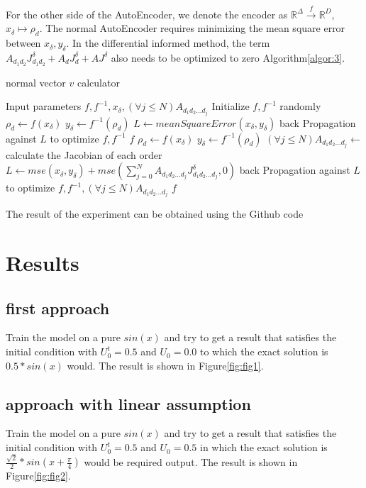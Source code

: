 \documentclass{article}
\begin{document}
For the other side of the AutoEncoder, we denote
the encoder as $\mathbb{R}^{\Delta} \xrightarrow{f} \mathbb{R}^{D}$,
$x_\delta \mapsto {\rho}_d$. The normal AutoEncoder
requires minimizing the mean square error between
$x_\delta, y_\delta$. In the differential informed
method, the
term $A_{d_1 d_2}J^\delta_{d_1 d_2}+A_{d}J^\delta_d+AJ^\delta$ also needs to be optimized to zero Algorithm\ref{algor:3}.
\begin{algorithm}
    \caption{normal vector $v$ calculator}\label{algor:3}
    \begin{algorithmic}[1]
        \REQUIRE Input parameters $f, f^{-1}, x_\delta ,(\forall j\leq N)A_{d_1 d_2 ... d_j}$
        \STATE Initialize $f, f^{-1}$ randomly
        \REPEAT
        \STATE $\rho_d \leftarrow f(x_\delta)$
        \STATE $y_\delta \leftarrow f^{-1}(\rho_d)$
        \STATE $L \leftarrow meanSquareError(x_\delta,y_\delta)$
        \STATE back Propagation against $L$ to optimize $f, f^{-1}$
        \RETURN $f$
        \REPEAT
        \STATE $\rho_d \leftarrow f(x_\delta)$
        \STATE $y_\delta \leftarrow f^{-1}(\rho_d)$
        \STATE $(\forall j\leq N)A_{d_1 d_2 ... d_j} \leftarrow$ calculate the Jacobian of each order
        \STATE $L \leftarrow mse(x_\delta,y_\delta)+mse(\sum_{j=0}^{N} A_{d_1 d_2 ... d_j}J^\delta_{d_1 d_2 ... d_j},0)$
        \STATE back Propagation against $L$ to optimize $f, f^{-1},(\forall j\leq N)A_{d_1 d_2 ... d_j}$
        \RETURN $f$
    \end{algorithmic}
\end{algorithm}

The result of the experiment can be obtained using the Github
code \cite[deLinearAugSine]{deLinearAugSine}

\section{Results}
\subsection{first approach}
Train the model on a pure $sin(x)$ and try to
get a result that satisfies the initial condition with
$U^{t}_0=0.5$ and $U_0=0.0$ to which the exact solution is $0.5*sin(x)$ would. The result is shown in Figure\ref{fig:fig1}.
\subsection{approach with linear assumption}
Train the model on a pure $sin(x)$ and try to
get a result that satisfies the initial condition with
$U^{t}_0=0.5$ and $U_0=0.5$ in which the exact solution is $\frac{\sqrt{2}}{2}*sin(x+\frac{\pi}{4})$ would be
required output. The result is shown in Figure\ref{fig:fig2}.
\end{document}
